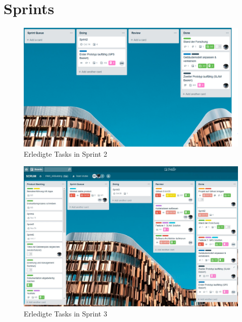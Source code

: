\documentclass[a4paper]{scrreprt}
\begin{document}
\chapter{Sprints}

\begin{figure}[h!]
	\includegraphics[keepaspectratio,width=\textwidth]{SprintReview_2}
	\caption{Erledigte Tasks in Sprint 2}
\end{figure}

\begin{figure}[h!]
	\includegraphics[keepaspectratio,width=\textwidth]{SprintReview_3}
	\caption{Erledigte Tasks in Sprint 3}
\end{figure}

\newpage
\end{document}
